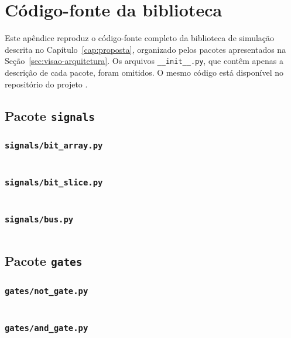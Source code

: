 
\chapter{Código-fonte da biblioteca}
\label{ap:biblioteca}

Este apêndice reproduz o código-fonte completo da biblioteca de simulação descrita no Capítulo~\ref{cap:proposta}, organizado pelos pacotes apresentados na Seção~\ref{sec:visao-arquitetura}. Os arquivos \texttt{\_\_init\_\_.py}, que contêm apenas a descrição de cada pacote, foram omitidos. O mesmo código está disponível no repositório do projeto \cite{esteche2026}.


\section{Pacote \texttt{signals}}

\subsection*{\texttt{signals/bit\_array.py}}
\inputminted{python}{../signals/bit_array.py}

\subsection*{\texttt{signals/bit\_slice.py}}
\inputminted{python}{../signals/bit_slice.py}

\subsection*{\texttt{signals/bus.py}}
\inputminted{python}{../signals/bus.py}

\section{Pacote \texttt{gates}}

\subsection*{\texttt{gates/not\_gate.py}}
\inputminted{python}{../gates/not_gate.py}

\subsection*{\texttt{gates/and\_gate.py}}
\inputminted{python}{../gates/and_gate.py}

